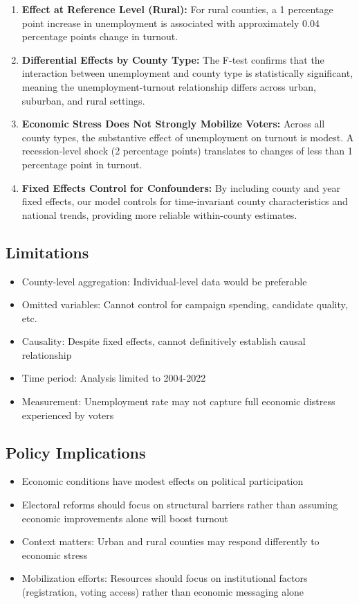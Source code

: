 \documentclass[
  11pt,
]{article}
\begin{document}
\begin{enumerate}
\def\labelenumi{\arabic{enumi}.}
\item
  \textbf{Effect at Reference Level (Rural):} For rural counties, a 1
  percentage point increase in unemployment is associated with
  approximately 0.04 percentage points change in turnout.
\item
  \textbf{Differential Effects by County Type:} The F-test confirms that
  the interaction between unemployment and county type is statistically
  significant, meaning the unemployment-turnout relationship differs
  across urban, suburban, and rural settings.
\item
  \textbf{Economic Stress Does Not Strongly Mobilize Voters:} Across all
  county types, the substantive effect of unemployment on turnout is
  modest. A recession-level shock (2 percentage points) translates to
  changes of less than 1 percentage point in turnout.
\item
  \textbf{Fixed Effects Control for Confounders:} By including county
  and year fixed effects, our model controls for time-invariant county
  characteristics and national trends, providing more reliable
  within-county estimates.
\end{enumerate}

\subsection{Limitations}\label{limitations}

\begin{itemize}
\item
  County-level aggregation: Individual-level data would be preferable
\item
  Omitted variables: Cannot control for campaign spending, candidate
  quality, etc.
\item
  Causality: Despite fixed effects, cannot definitively establish causal
  relationship
\item
  Time period: Analysis limited to 2004-2022
\item
  Measurement: Unemployment rate may not capture full economic distress
  experienced by voters
\end{itemize}

\subsection{Policy Implications}\label{policy-implications}

\begin{itemize}
\item
  Economic conditions have modest effects on political participation
\item
  Electoral reforms should focus on structural barriers rather than
  assuming economic improvements alone will boost turnout
\item
  Context matters: Urban and rural counties may respond differently to
  economic stress
\item
  Mobilization efforts: Resources should focus on institutional factors
  (registration, voting access) rather than economic messaging alone
\end{itemize}
\end{document}
